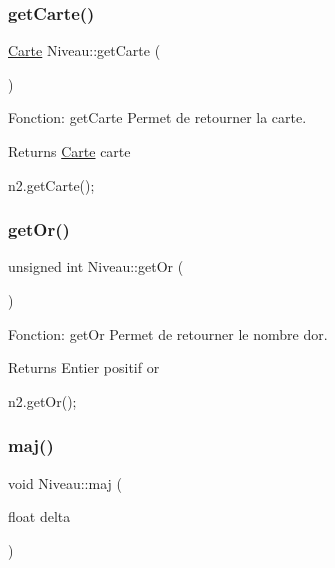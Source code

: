 \subsubsection{\texorpdfstring{get\+Carte()}{getCarte()}}
{\footnotesize\ttfamily \hyperlink{classCarte}{Carte} Niveau\+::get\+Carte (\begin{DoxyParamCaption}{ }\end{DoxyParamCaption})}



Fonction\+: get\+Carte Permet de retourner la carte. 

\begin{DoxyReturn}{Returns}
\hyperlink{classCarte}{Carte} carte 
\begin{DoxyCode}
n2.getCarte();
\end{DoxyCode}
 
\end{DoxyReturn}
\mbox{\label{classNiveau_a86202965dadd70b9f13c4e5e78a46542}} 
\subsubsection{\texorpdfstring{get\+Or()}{getOr()}}
{\footnotesize\ttfamily unsigned int Niveau\+::get\+Or (\begin{DoxyParamCaption}{ }\end{DoxyParamCaption})}



Fonction\+: get\+Or Permet de retourner le nombre d\textquotesingle{}or. 

\begin{DoxyReturn}{Returns}
Entier positif or 
\begin{DoxyCode}
n2.getOr();
\end{DoxyCode}
 
\end{DoxyReturn}
\mbox{\label{classNiveau_a4434c142b17c0299d2d7744b2ea11e99}} 
\subsubsection{\texorpdfstring{maj()}{maj()}}
{\footnotesize\ttfamily void Niveau\+::maj (\begin{DoxyParamCaption}\item[{float}]{delta }\end{DoxyParamCaption})}



